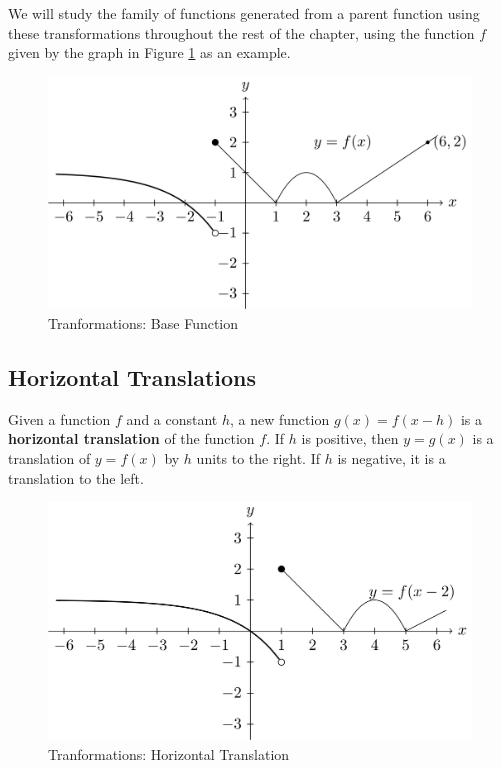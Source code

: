 \documentclass[
]{book}
\theoremstyle{definition}
\theoremstyle{definition}
\theoremstyle{definition}
\theoremstyle{remark}
\begin{document}
We will study the family of functions generated from a parent function using these transformations throughout the rest of the chapter, using the function \(f\) given by the graph in Figure \ref{fig:base-function} as an example.

\begin{figure}

{\centering \includegraphics[width=0.8\linewidth]{tikz/base-function} 

}

\caption{Tranformations: Base Function}\label{fig:base-function}
\end{figure}

\hypertarget{horizontal-translations}{%
\subsection{Horizontal Translations}\label{horizontal-translations}}

Given a function \(f\) and a constant \(h\), a new function \(g(x)=f(x-h)\) is a \textbf{horizontal translation} of the function \(f\). If \(h\) is positive, then \(y=g(x)\) is a translation of \(y=f(x)\) by \(h\) units to the right. If \(h\) is negative, it is a translation to the left.

\begin{figure}

{\centering \includegraphics[width=0.8\linewidth]{tikz/horizontal-translation} 

}

\caption{Tranformations: Horizontal Translation}\label{fig:horizontal-translation}
\end{figure}
\end{document}
